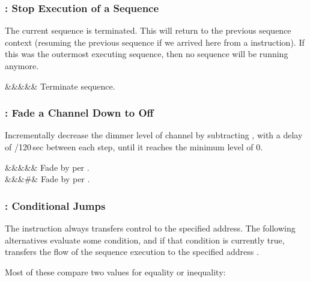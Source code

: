 \documentclass[letterpaper,twoside,onecolumn,openright,final]{memoir}
\begin{document}
{\subsubsection{: Stop Execution of a Sequence}
The current sequence is terminated.  This will return to the previous sequence context
(resuming the previous sequence if we arrived here from a  instruction).  If this
was the outermost executing sequence, then no sequence will be running anymore.

\begin{opdesc}
   &&&&& Terminate sequence.
\end{opdesc}

\subsubsection{: Fade a Channel Down to Off}
Incrementally decrease the dimmer level of channel  by subtracting , with a delay
of /120\,sec between each step, until it reaches the minimum level of 0.

\begin{opdesc}
   &&&&\z{\$,\$,\$}& Fade  by  per .\\
   &&&\z\#\z{,\#}\z{,\#}& Fade  by  per .\\
\end{opdesc}

\subsubsection{: Conditional Jumps}
The  instruction always transfers control to the specified address.  The following
alternatives evaluate some condition, and if that condition is currently true, transfers
the flow of the sequence execution to the specified address .

Most of these compare two values for equality or inequality:

}
\end{document}
